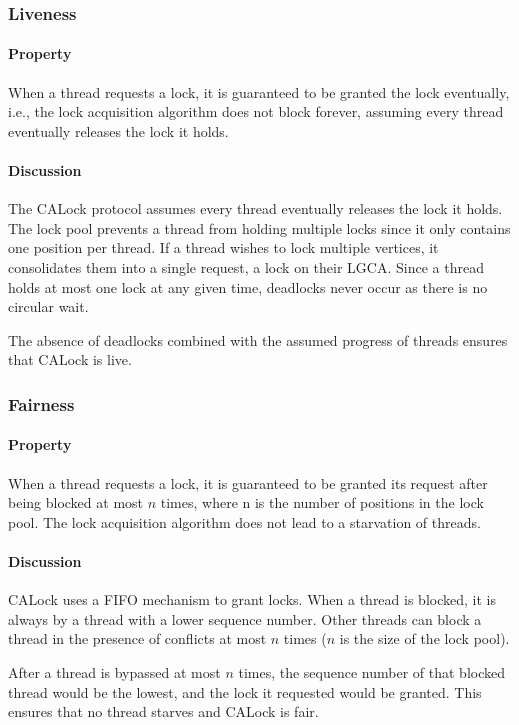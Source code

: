 \subsubsection[Liveness]{Liveness}
\paragraph{Property} When a thread requests a lock, it is guaranteed to be granted the lock eventually, i.e., 
the lock acquisition algorithm does not block forever, assuming every thread eventually releases the lock it holds.

\paragraph{Discussion}
The CALock protocol assumes every thread eventually releases the lock it holds. The lock pool prevents a thread from holding multiple locks since it only contains one position per thread. 
If a thread wishes to lock multiple vertices, it consolidates them into a single request, a lock on their LGCA. 
Since a thread holds at most one lock at any given time, deadlocks never occur as there is no circular wait.

The absence of deadlocks combined with the assumed progress of threads ensures that CALock is live. 

\subsubsection[Fairness]{Fairness}
\paragraph{Property} When a thread requests a lock, it is guaranteed to be granted its request after being blocked at most $\mathit{n}$ times, where n is the number of positions in the lock pool. 
The lock acquisition algorithm does not lead to a starvation of threads.

\paragraph{Discussion}
CALock uses a FIFO mechanism to grant locks. When a thread is blocked, it is always by a thread with a lower sequence number.
Other threads can block a thread in the presence of conflicts at most $n$ times ($n$ is the size of the lock pool).  

After a thread is bypassed at most $n$ times, the sequence number of that blocked thread would be the lowest, and the lock it requested would be granted. 
This ensures that no thread starves and CALock is fair.


